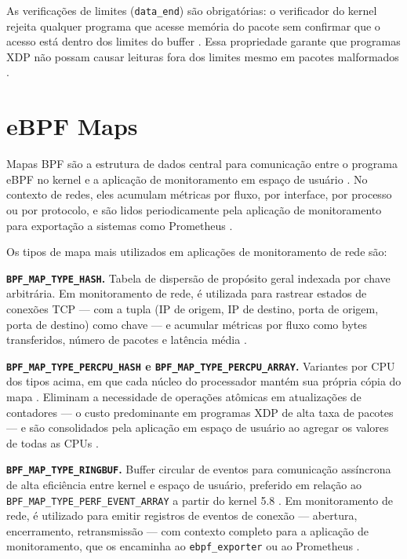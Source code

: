 As verificações de limites (\texttt{data\_end}) são obrigatórias: o verificador
do kernel rejeita qualquer programa que acesse memória do pacote sem confirmar
que o acesso está dentro dos limites do buffer \cite{linuxkernel2024}.
Essa propriedade garante que programas XDP não possam causar leituras fora dos
limites mesmo em pacotes malformados \cite{gregg2019}.

\section{eBPF Maps}

Mapas BPF são a estrutura de dados central para comunicação entre o programa eBPF
no kernel e a aplicação de monitoramento em espaço de usuário \cite{linuxkernel2024}.
No contexto de redes, eles acumulam métricas por fluxo, por interface, por processo
ou por protocolo, e são lidos periodicamente pela aplicação de monitoramento para
exportação a sistemas como Prometheus \cite{prometheusdocs}.

Os tipos de mapa mais utilizados em aplicações de monitoramento de rede são:

\textbf{\texttt{BPF\_MAP\_TYPE\_HASH}.}
Tabela de dispersão de propósito geral indexada por chave arbitrária.
Em monitoramento de rede, é utilizada para rastrear estados de conexões TCP ---
com a tupla (IP de origem, IP de destino, porta de origem, porta de destino)
como chave --- e acumular métricas por fluxo como bytes transferidos, número de
pacotes e latência média \cite{gregg2019}.

\textbf{\texttt{BPF\_MAP\_TYPE\_PERCPU\_HASH} e \texttt{BPF\_MAP\_TYPE\_PERCPU\_ARRAY}.}
Variantes por CPU dos tipos acima, em que cada núcleo do processador mantém sua
própria cópia do mapa \cite{linuxkernel2024}.
Eliminam a necessidade de operações atômicas em atualizações de contadores ---
o custo predominante em programas XDP de alta taxa de pacotes --- e são
consolidados pela aplicação em espaço de usuário ao agregar os valores de todas
as CPUs \cite{gregg2020}.

\textbf{\texttt{BPF\_MAP\_TYPE\_RINGBUF}.}
Buffer circular de eventos para comunicação assíncrona de alta eficiência entre
kernel e espaço de usuário, preferido em relação ao
\texttt{BPF\_MAP\_TYPE\_PERF\_EVENT\_ARRAY} a partir do kernel 5.8
\cite{linuxkernel2024}.
Em monitoramento de rede, é utilizado para emitir registros de eventos de conexão
--- abertura, encerramento, retransmissão --- com contexto completo para a
aplicação de monitoramento, que os encaminha ao \texttt{ebpf\_exporter}
\cite{ebpfexporter} ou ao Prometheus \cite{prometheusdocs}.

